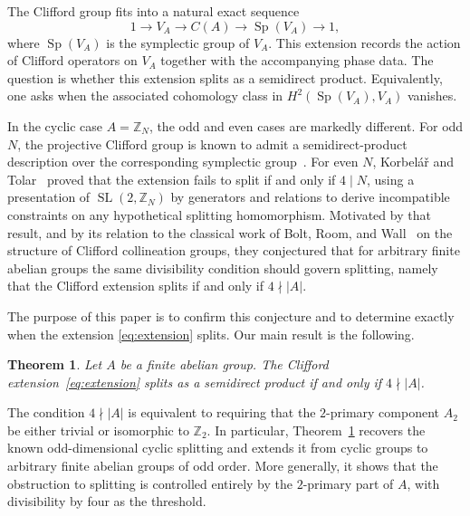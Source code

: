 \documentclass[11pt, reqno]{amsart}
\newtheorem{theorem}{Theorem}[section]
\theoremstyle{definition}
\theoremstyle{remark}
\newcommand{\Z}{\mathbb{Z}}
\DeclareMathOperator{\Sp}{Sp}
\DeclareMathOperator{\SL}{SL}
\begin{document}
The Clifford group fits into a natural exact sequence
\begin{equation}\label{eq:extension}
1 \longrightarrow V_A \longrightarrow C(A) \longrightarrow \Sp(V_A) \longrightarrow 1,
\end{equation}
where $\Sp(V_A)$ is the symplectic group of $V_A$. This extension records the action of Clifford operators on $V_A$ together with the accompanying phase data. The question is whether this extension splits as a semidirect product.
Equivalently, one asks when the associated cohomology class in $H^2(\Sp(V_A),V_A)$ vanishes.

In the cyclic case $A = \Z_N$, the odd and even cases are markedly different. For odd $N$, the projective Clifford group is known to admit a semidirect-product description over the corresponding symplectic group~\cite{Appleby2005,Gross2006}. For even $N$, Korbe\-l\'a\v{r} and Tolar~\cite{KT23} proved that the extension fails to split if and only if $4 \mid N$, using a presentation of $\SL(2,\Z_N)$ by generators and relations to derive incompatible constraints on any hypothetical splitting homomorphism. Motivated by that result, and by its relation to the classical work of Bolt, Room, and Wall~\cite{BoltRoomWall1961a,BoltRoomWall1961b} on the structure of Clifford collineation groups, they conjectured that for arbitrary finite abelian groups the same divisibility condition should govern splitting, namely that the Clifford extension splits if and only if $4 \nmid |A|$.

The purpose of this paper is to confirm this conjecture and to determine exactly when the extension \eqref{eq:extension} splits. Our main result is the following.

\begin{theorem}\label{thm:main}
Let $A$ be a finite abelian group. The Clifford extension~\eqref{eq:extension} splits as a semidirect product if and only if $4 \nmid |A|$.
\end{theorem}

The condition $4 \nmid |A|$ is equivalent to requiring that the $2$-primary component $A_2$ be either trivial or isomorphic to $\Z_2$. In particular, Theorem~\ref{thm:main} recovers the known odd-dimensional cyclic splitting and extends it from cyclic groups to arbitrary finite abelian groups of odd order. More generally, it shows that the obstruction to splitting is controlled entirely by the $2$-primary part of $A$, with divisibility by four as the threshold.
\end{document}

